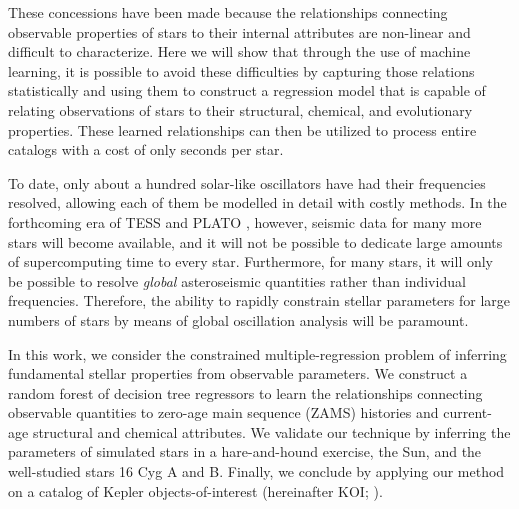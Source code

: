 \documentclass[twocolumn,twocolappendix]{aastex6}
\begin{document}
These concessions have been made because the relationships connecting observable properties of stars to their internal attributes are non-linear and difficult to characterize. Here we will show that through the use of machine learning, it is possible to avoid these difficulties by capturing those relations statistically and using them to construct a regression model that is capable of relating observations of stars to their structural, chemical, and evolutionary properties. These learned relationships can then be utilized to process entire catalogs with a cost of only seconds per star. 

To date, only about a hundred solar-like oscillators have had their frequencies resolved, allowing each of them be modelled in detail with costly methods. In the forthcoming era of TESS \citep{2015JATIS...1a4003R} and PLATO \citep{2014ExA....38..249R}, however, seismic data for many more stars will become available, and it will not be possible to dedicate large amounts of supercomputing time to every star. Furthermore, for many stars, it will only be possible to resolve \emph{global} asteroseismic quantities rather than individual frequencies. Therefore, the ability to rapidly constrain stellar parameters for large numbers of stars by means of global oscillation analysis will be paramount. 

In this work, we consider the constrained multiple-regression problem of inferring fundamental stellar properties from observable parameters. We construct a random forest of decision tree regressors to learn the relationships connecting observable quantities to zero-age main sequence (ZAMS) histories and current-age structural and chemical attributes. We validate our technique by inferring the parameters of simulated stars in a hare-and-hound exercise, the Sun, and the well-studied stars 16 Cyg A and B. Finally, we conclude by applying our method on a catalog of Kepler objects-of-interest (hereinafter KOI; \citealt{2016MNRAS.456.2183D}).  
\end{document}
